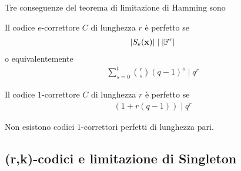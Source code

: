 Tre conseguenze del teorema di limitazione di Hamming sono
\begin{corollario}
    Il codice $e$-correttore $C$ di lunghezza $r$ è perfetto se 
    \begin{align*}
        \arrowvert S_{e}(\mathbf{x})  \arrowvert \mid  \arrowvert \mathbb{F}^{r} \arrowvert
     \end{align*}
     o equivalentemente
     \begin{align*}
         \sum_{s=0}^{t} \binom{r}{s}(q-1)^{s} \mid q^r
     \end{align*}
\end{corollario}

\begin{corollario}
    Il codice $1$-correttore $C$ di lunghezza $r$ è perfetto se 
     \begin{align*}
         (1+r(q-1)) \mid q^r
     \end{align*}
\end{corollario}

\begin{corollario}
    Non esistono codici $1$-correttori perfetti di lunghezza pari.
\end{corollario}

\subsection{(r,k)-codici e limitazione di Singleton}

